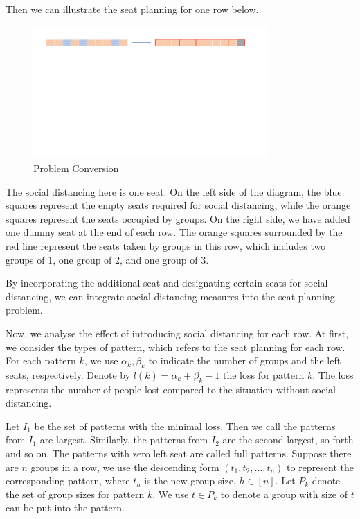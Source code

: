 Then we can illustrate the seat planning for one row below. 

\begin{figure}[ht]
    \centering
    \includegraphics[width = 0.8\textwidth]{./Figures/dummy_seat.pdf}
    \caption{Problem Conversion}
\end{figure}

The social distancing here is one seat. On the left side of the diagram, the blue squares represent the empty seats required for social distancing, while the orange squares represent the seats occupied by groups. On the right side, we have added one dummy seat at the end of each row. The orange squares surrounded by the red line represent the seats taken by groups in this row, which includes two groups of 1, one group of 2, and one group of 3.

By incorporating the additional seat and designating certain seats for social distancing, we can integrate social distancing measures into the seat planning problem.


Now, we analyse the effect of introducing social distancing for each row. At first, we consider the types of pattern, which refers to the seat planning for each row. For each pattern $k$, we use $\alpha_k, \beta_k$ to indicate the number of groups and the left seats, respectively. Denote by $l(k) = \alpha_k + \beta_k -1$ the loss for pattern $k$. The loss represents the number of people lost compared to the situation without social distancing.

Let $I_1$ be the set of patterns with the minimal loss. Then we call the patterns from $I_1$ are largest. Similarly, the patterns from $I_2$ are the second largest, so forth and so on. The patterns with zero left seat are called full patterns. Suppose there are $n$ groups in a row, we use the descending form $(t_1, t_2, \ldots, t_n)$ to represent the corresponding pattern, where $t_h$ is the new group size, $h \in [n]$. Let $P_{k}$ denote the set of group sizes for pattern $k$. We use $t \in P_{k}$ to denote a group with size of $t$ can be put into the pattern. 


